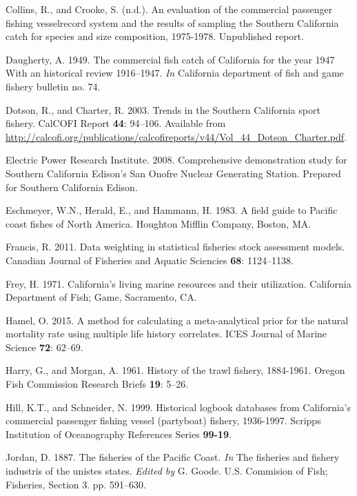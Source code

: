 \documentclass[12pt,]{article}
\begin{document}
\hypertarget{ref-Collins1978}{}
Collins, R., and Crooke, S. (n.d.). An evaluation of the commercial
passenger fishing vesselrecord system and the results of sampling the
Southern California catch for species and size composition, 1975-1978.
Unpublished report.

\hypertarget{ref-Daugherty1949}{}
Daugherty, A. 1949. The commercial fish catch of California for the year
1947 With an historical review 1916--1947. \emph{In} California
department of fish and game fishery bulletin no. 74.

\hypertarget{ref-Dotson2003}{}
Dotson, R., and Charter, R. 2003. Trends in the Southern California
sport fishery. CalCOFI Report \textbf{44}: 94--106. Available from
\url{http://calcofi.org/publications/calcofireports/v44/Vol_44_Dotson_Charter.pdf}.

\hypertarget{ref-EPRI2008}{}
Electric Power Research Institute. 2008. Comprehensive demonstration
study for Southern California Edison's San Onofre Nuclear Generating
Station. Prepared for Southern California Edison.

\hypertarget{ref-Eschmeyer1983}{}
Eschmeyer, W.N., Herald, E., and Hammann, H. 1983. A field guide to
Pacific coast fishes of North America. Houghton Mifflin Company, Boston,
MA.

\hypertarget{ref-Francis2011}{}
Francis, R. 2011. Data weighting in statistical fisheries stock
assessment models. Canadian Journal of Fisheries and Aquatic Sciencies
\textbf{68}: 1124--1138.

\hypertarget{ref-Frey1971}{}
Frey, H. 1971. California's living marine resources and their
utilization. California Department of Fish; Game, Sacramento, CA.

\hypertarget{ref-Hamel2015}{}
Hamel, O. 2015. A method for calculating a meta-analytical prior for the
natural mortality rate using multiple life history correlates. ICES
Journal of Marine Science \textbf{72}: 62--69.

\hypertarget{ref-Harry1961}{}
Harry, G., and Morgan, A. 1961. History of the trawl fishery, 1884-1961.
Oregon Fish Commission Research Briefs \textbf{19}: 5--26.

\hypertarget{ref-Hill1999}{}
Hill, K.T., and Schneider, N. 1999. Historical logbook databases from
California's commercial passenger fishing vessel (partyboat) fishery,
1936-1997. Scripps Institution of Oceanography References Series
\textbf{99-19}.

\hypertarget{ref-Jordan1887}{}
Jordan, D. 1887. The fisheries of the Pacific Coast. \emph{In} The
fisheries and fishery industris of the unistes states. \emph{Edited by}
G. Goode. U.S. Commision of Fish; Fisheries, Section 3. pp. 591--630.
\end{document}
